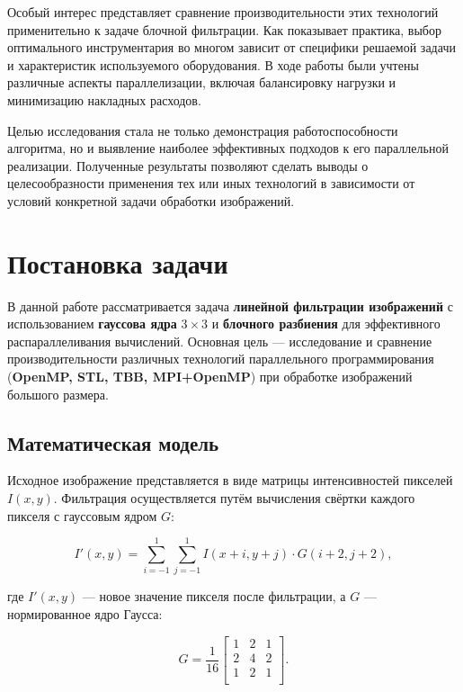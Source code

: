 \documentclass[a4paper,12pt]{article}
\begin{document}
Особый интерес представляет сравнение производительности этих технологий применительно к задаче блочной фильтрации. Как показывает практика, выбор оптимального инструментария во многом зависит от специфики решаемой задачи и характеристик используемого оборудования. В ходе работы были учтены различные аспекты параллелизации, включая балансировку нагрузки и минимизацию накладных расходов.

Целью исследования стала не только демонстрация работоспособности алгоритма, но и выявление наиболее эффективных подходов к его параллельной реализации. Полученные результаты позволяют сделать выводы о целесообразности применения тех или иных технологий в зависимости от условий конкретной задачи обработки изображений.

\newpage

\section{Постановка задачи}

В данной работе рассматривается задача \textbf{линейной фильтрации изображений} с использованием \textbf{гауссова ядра} $3\times3$ и \textbf{блочного разбиения} для эффективного распараллеливания вычислений. Основная цель --- исследование и сравнение производительности различных технологий параллельного программирования (\textbf{OpenMP, STL, TBB, MPI+OpenMP}) при обработке изображений большого размера.

\subsection*{Математическая модель}
Исходное изображение представляется в виде матрицы интенсивностей пикселей $I(x, y)$. Фильтрация осуществляется путём вычисления свёртки каждого пикселя с гауссовым ядром $G$:

\[
I'(x, y) = \sum_{i=-1}^{1} \sum_{j=-1}^{1} I(x+i, y+j) \cdot G(i+2, j+2),
\]

где $I'(x, y)$ --- новое значение пикселя после фильтрации, а $G$ --- нормированное ядро Гаусса:

\[
G = \frac{1}{16}
\begin{bmatrix}
1 & 2 & 1 \\
2 & 4 & 2 \\
1 & 2 & 1 \\
\end{bmatrix}.
\]
\end{document}
